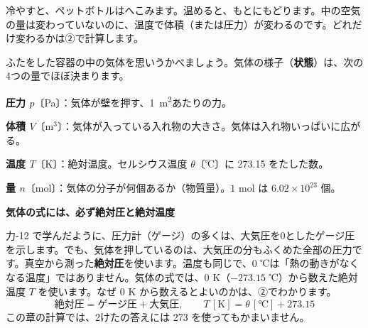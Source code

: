 \noindent 冷やすと、ペットボトルはへこみます。温めると、もとにもどります。中の空気の量は変わっていないのに、温度で体積（または圧力）が変わるのです。どれだけ変わるかは②で計算します。

\begin{omoidasou}
\end{omoidasou}



\leavevmode\label{ph:熱-3:sec1}ふたをした容器の中の気体を思いうかべましょう。気体の様子（\textbf{状態}）は、次の4つの量でほぼ決まります。
\begin{enumerate}[label={\bkcircled[bkBlue]{\arabic*}}, leftmargin=2.4\zw, itemsep=2pt, topsep=2pt]
\item \textbf{圧力 $p$}〔Pa〕：気体が壁を押す、\qty{1}{m^2}あたりの力。
\item \textbf{体積 $V$}〔m$^3$〕：気体が入っている入れ物の大きさ。気体は入れ物いっぱいに広がる。
\item \textbf{温度 $T$}〔K〕：絶対温度。セルシウス温度 $\theta$〔℃〕に 273.15 をたした数。
\item \textbf{量 $n$}〔mol〕：気体の分子が何個あるか（物質量）。$1$ mol は $6.02\times10^{23}$ 個。
\end{enumerate}

\noindent\textbf{気体の式には、必ず絶対圧と絶対温度}\par\nobreak
力-12 で学んだように、圧力計（ゲージ）の多くは、大気圧を0としたゲージ圧を示します。でも、気体を押しているのは、大気圧の分もふくめた全部の圧力です。真空から測った\textbf{絶対圧}を使います。温度も同じで、0 ℃は「熱の動きがなくなる温度」ではありません。気体の式では、0 K（$-273.15$ ℃）から数えた絶対温度 $T$ を使います。なぜ 0 K から数えるとよいのかは、②でわかります。
\[ \text{絶対圧}=\text{ゲージ圧}+\text{大気圧},\qquad T\,[\mathrm{K}]=\theta\,[\text{℃}]+273.15 \]
この章の計算では、2けたの答えには 273 を使ってもかまいません。

